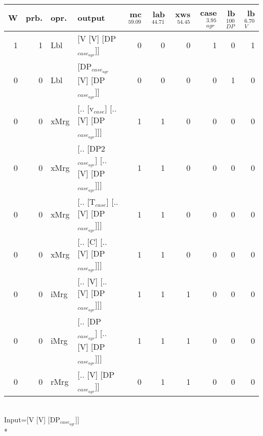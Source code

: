 \begin{tabularx}{\linewidth}{rrlXrrrrrr}
\hline
   W &   prb. & opr.   & output                                     &   mc$^{59.09}$ &   lab$^{44.71}$ &   xws$^{54.45}$ &   case$_{agr}^{3.95}$ &   lb$_{DP}^{100}$ &   lb$_{V}^{6.70}$ \\
\hline
   1 &   1 & Lbl  & [V [V] [DP$_{case_{agr}}$]]                      &            0 &             0 &             0 &                  1 &                0 &              1 \\
   0 &   0 & Lbl  & [DP$_{case_{agr}}$ [V] [DP$_{case_{agr}}$]]            &            0 &             0 &             0 &                  0 &                1 &              0 \\
   0 &   0 & xMrg & [.. [v$_{case}$] [.. [V] [DP$_{case_{agr}}$]]]       &            1 &             1 &             0 &                  0 &                0 &              0 \\
   0 &   0 & xMrg & [.. [DP2$_{case_{agr}}$] [.. [V] [DP$_{case_{agr}}$]]] &            1 &             1 &             0 &                  0 &                0 &              0 \\
   0 &   0 & xMrg & [.. [T$_{case}$] [.. [V] [DP$_{case_{agr}}$]]]       &            1 &             1 &             0 &                  0 &                0 &              0 \\
   0 &   0 & xMrg & [.. [C] [.. [V] [DP$_{case_{agr}}$]]]            &            1 &             1 &             0 &                  0 &                0 &              0 \\
   0 &   0 & iMrg & [.. [V] [.. [V] [DP$_{case_{agr}}$]]]            &            1 &             1 &             1 &                  0 &                0 &              0 \\
   0 &   0 & iMrg & [.. [DP$_{case_{agr}}$] [.. [V] [DP$_{case_{agr}}$]]]  &            1 &             1 &             1 &                  0 &                0 &              0 \\
   0 &   0 & rMrg & [.. [V] [DP$_{case_{agr}}$]]                     &            0 &             1 &             1 &                  0 &                0 &              0 \\
\hline
\end{tabularx}\endgroup\\
\begingroup\scriptsize Input=[V [V] [DP$_{case_{agr}}$]]\\*
